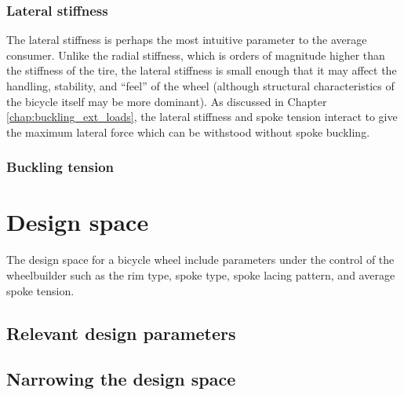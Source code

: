 \documentclass[\rootdir/thesis.tex]{subfiles}
\begin{document}
\subsubsection*{Lateral stiffness}
The lateral stiffness is perhaps the most intuitive parameter to the average consumer. Unlike the radial stiffness, which is orders of magnitude higher than the stiffness of the tire, the lateral stiffness is small enough that it may affect the handling, stability, and ``feel'' of the wheel (although structural characteristics of the bicycle itself may be more dominant). As discussed in Chapter \ref{chap:buckling_ext_loads}, the lateral stiffness and spoke tension interact to give the maximum lateral force which can be withstood without spoke buckling.

\subsubsection*{Buckling tension}

\section{Design space}

The design space for a bicycle wheel include parameters under the control of the wheelbuilder such as the rim type, spoke type, spoke lacing pattern, and average spoke tension. 

\subsection{Relevant design parameters}

\subsection{Narrowing the design space}
\end{document}
